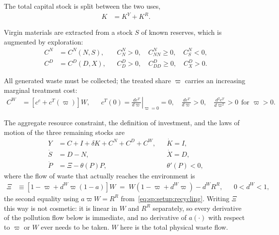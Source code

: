  The total capital stock is split between the two uses,
\begin{align}
K &= K^Y + K^R.
\label{eq:sp:setup:capital-allocation}
\end{align}

 Virgin materials are extracted from a stock $S$ of known reserves, which is augmented by exploration:
\begin{align}
C^N &= C^N(N,S),
&&
C^N_N>0,\quad C^N_{NN}\ge 0,\quad C^N_S<0,
\label{eq:sp:setup:extraction-cost}
\\
C^D &= C^D(D,X),
&&
C^D_D>0,\quad C^D_{DD}\ge 0,\quad C^D_X>0.
\label{eq:sp:setup:discovery-cost}
\end{align}

 All generated waste must be collected; the treated share $\varpi$ carries an increasing marginal treatment cost:
\begin{align}
C^W &= \left[c^c+c^T(\varpi)\right]W,
&&
c^T(0)=\left.\frac{dc^T}{d\varpi}\right|_{\varpi=0}=0,\quad
\frac{dc^T}{d\varpi}>0,\quad \frac{d^2c^T}{d\varpi^2}>0 \ \ \text{for }\varpi>0.
\label{eq:sp:setup:waste-cost}
\end{align}

 The aggregate resource constraint, the definition of investment, and the laws of motion of the three remaining stocks are
\begin{align}
Y &= C+I+\delta K+C^N+C^D+C^W,
&&
\dot K = I,
\label{eq:sp:setup:resource-constraint}
\\
\dot S &= D-N,
&&
\dot X = D,
\label{eq:sp:setup:reserves-motion}
\\
\dot P &= \Xi-\theta(P)P,
&&
\theta'(P)<0,
\label{eq:sp:setup:pollution-motion}
\end{align}
where the flow of waste that actually reaches the environment is
\begin{align}
\Xi &\equiv \left[1-\varpi+d^W\varpi\left(1-a\right)\right]W
\;=\; W\left(1-\varpi+d^W\varpi\right)-d^WR^R,
&&
0<d^W<1,
\label{eq:sp:setup:Xi}
\end{align}
the second equality using $a\varpi W=R^R$ from~\eqref{eq:sp:setup:recycling}. Writing $\Xi$ this way is not cosmetic: it is linear in $W$ and $R^R$ separately, so every derivative of the pollution flow below is immediate, and no derivative of $a(\cdot)$ with respect to $\varpi$ or $W$ ever needs to be taken. $W$ here is the total physical waste flow.


